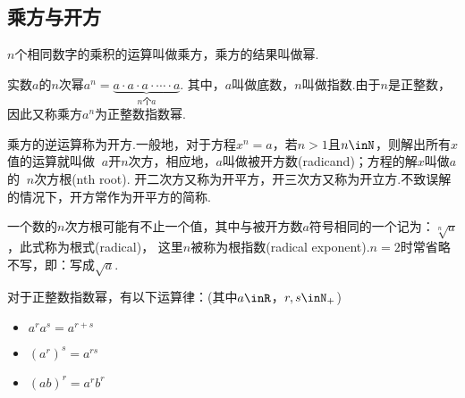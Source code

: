   \subsection{乘方与开方}
    \begin{description}[leftmargin=0pt]
      \item [乘方] $n$个相同数字的乘积的运算叫做{\fangsong 乘方}，乘方的结果叫做{\fangsong 幂}. \par
        实数$a$的$n$次幂$a^n=\underbrace{{a\cdot a\cdot a\cdot \cdots \cdot a}}_{n\text{个}a}$.
        其中，$a$叫做{\fangsong 底数}，$n$叫做{\fangsong 指数}.由于$n$是正整数，因此又称乘方$a^n$为{\fangsong 正整数指数幂}.
      \item [开方] 乘方的逆运算称为{\fangsong 开方}.一般地，对于方程$x^n=a$，若$n>1$且$n\inN$，则解出所有$x$值的运算就叫做
        {\fangsong $~a$开$n$次方}，相应地，$a$叫做{\fangsong 被开方数}(radicand)；方程的解$x$叫做$a$的 {\fangsong $~n$次方根}(nth root).
        开二次方又称为{\fangsong 开平方}，开三次方又称为{\fangsong 开立方}.不致误解的情况下，开方常作为开平方的简称.

        一个数的$n$次方根可能有不止一个值，其中与被开方数$a$符号相同的一个记为：$\sqrt[n]a$，此式称为{\fangsong 根式}(radical)，
        这里$n$被称为{\fangsong 根指数(radical exponent)}.$n=2$时常省略不写，即：写成$\sqrt a$.
      \item [运算性质]对于正整数指数幂，有以下运算律：(其中$a\inR$，$r,s\inN_+$)
        \begin{itemize}%
          \item $a^ra^s=a^{r+s}$
          \item $(a^r)^s=a^{rs}$
          \item $(ab)^r=a^rb^r$
        \end{itemize}
    \end{description}
